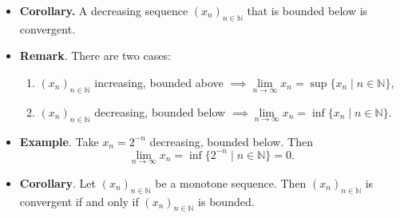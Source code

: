 \documentclass{article}
\newcommand{\N}{\mathbb{N}}
\newcommand{\seq}[2]{(#1_{#2})_{#2 \in \N}}
\newcommand{\set}[2]{\{ #1 \mid #2 \}}
\newcommand{\?}{\stackrel{?}{=}}
\theoremstyle{definition} %
\begin{document}
\begin{itemize}
\begin{lemma}
              Any increasing sequence that is bounded above is convergent.
          \end{lemma}
          \begin{proof}
              Let $X = \set{x_n}{n \in \N}$. Then $x_n \leq M, n \in \N \implies X$ bounded above $\implies x = \sup(X)$. \\\\
              We want to show that $\seq{x}{n}$ converges to $x = \sup(X)$. This means (by definition) that for every $\varepsilon > 0$, there exists $N(\varepsilon) \in \N$ such that
              $$|x_n - x| \leq \varepsilon \ \forall n \geq N(\varepsilon).$$
              Note that $x = \sup(X)$ implies two important things:
              \begin{enumerate}[label=(\roman*)]
                  \item $x_n \leq x \ \forall n \in \N$,
                  \item $\forall \varepsilon > 0, \ \exists x_\varepsilon \in X$ such that $x - x_\varepsilon \leq \varepsilon$ by the characterization of supremum. Note, we can equivalently replace $x_\varepsilon$ with $x_{n_\varepsilon} \in \N$ to obtain $\forall \varepsilon > 0, \ \exists x_{n_\varepsilon} \in X$ such that $x - x_{n_\varepsilon} \leq \varepsilon$.
              \end{enumerate}
              So, let $\varepsilon > 0$, compute
              \begin{align*}
                  |x_n - x| & = x - x_n                                   \\
                            & \leq x - x_{n_\varepsilon} \leq \varepsilon
              \end{align*}
              with $x_{n_\varepsilon} \leq x_n$ and $n \geq n_\varepsilon$ ($\seq{x}{n}$ increasing) and for all $\varepsilon > 0$, take $N(\varepsilon) = n_\varepsilon$.
          \end{proof}
    \item \textbf{Corollary.} A decreasing sequence $\seq{x}{n}$ that is bounded below is convergent.
    \item \textbf{Remark}. There are two cases:
          \begin{enumerate}[label=(\roman*)]
              \item $\seq{x}{n}$ increasing, bounded above $\implies \lim\limits_{n \to \infty} x_n = \sup \set{x_n}{n \in \N}$,
              \item $\seq{x}{n}$ decreasing, bounded below $\implies \lim\limits_{n \to \infty} x_n = \inf \set{x_n}{n \in \N}$.
          \end{enumerate}
    \item \textbf{Example}. Take $x_n = 2^{-n}$ decreasing, bounded below. Then
          $$\lim\limits_{n \to \infty} x_n = \inf\set{2^{-n}}{ n \in \N} = 0.$$
    \item \textbf{Corollary}. Let $\seq{x}{n}$ be a monotone sequence. Then $\seq{x}{n}$ is convergent if and only if $\seq{x}{n}$ is bounded.
\end{itemize}
\end{document}
